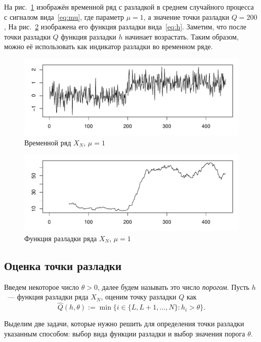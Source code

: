 \documentclass{math-mech-sci}
\begin{document}
На рис.~\ref{fig:x_mu_small} изображён временной ряд с разладкой в среднем случайного процесса с сигналом вида~\eqref{eq:mu}, где параметр $\mu=1$, а значение точки разладки $Q=200$,
На рис.~\ref{fig:e_mu_small} изображена его функция разладки вида~\eqref{eq:h}. Заметим, что после точки разладки $Q$ функция разладки $h$ начинает возрастать. Таким образом, можно её использовать как индикатор разладки во временном ряде.
\begin{figure}[h!]
	\includegraphics[width=\textwidth]{S_mu_small}\caption{Временной ряд $X_N$, $\mu=1$}\label{fig:x_mu_small}
\end{figure}
\begin{figure}
	\includegraphics[width=\textwidth]{E_mu_small}\caption{Функция разладки ряда $X_N$, $\mu=1$}\label{fig:e_mu_small}
\end{figure}

\subsection{Оценка точки разладки}
Введем некоторое число $\theta >0$, далее будем называть это число \textit{порогом}. Пусть $h$~--- функция разладки ряда $X_N$, оценим точку разладки $Q$ как
\begin{equation}
\widehat Q(h,\theta):=\min\{i\in\{L,L+1,\ldots,N\}:h_i>\theta\}.
\end{equation}

Выделим две задачи, которые нужно решить для определения точки разладки указанным способом: выбор вида функции разладки и выбор значения порога $\theta$. 
\end{document}
